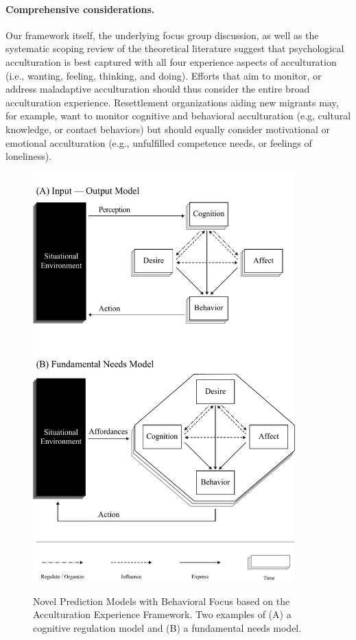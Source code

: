 \documentclass[man, 12pt, a4paper, mask]{apa7}
\begin{document}
\paragraph{Comprehensive considerations.} Our framework itself, the underlying focus group discussion, as well as the systematic scoping review of the theoretical literature suggest that psychological acculturation is best captured with all four experience aspects of acculturation (i.e., wanting, feeling, thinking, and doing). Efforts that aim to monitor, or address maladaptive acculturation should thus consider the entire broad acculturation experience. Resettlement organizations aiding new migrants may, for example, want to monitor cognitive and behavioral acculturation (e.g, cultural knowledge, or contact behaviors) but should equally consider motivational or emotional acculturation (e.g., unfulfilled competence needs, or feelings of loneliness). 



\begin{figure}[ht!]
\centering
    \caption{Novel Prediction Models with Behavioral Focus based on the Acculturation Experience Framework. Two examples of (A) a cognitive regulation model and (B) a fundamental needs model.}
\includegraphics[width=0.9\textwidth]{Figures/NovelPredictionsBehaviorTime.pdf}
\label{fig:NovelModels}
\end{figure}
\end{document}
